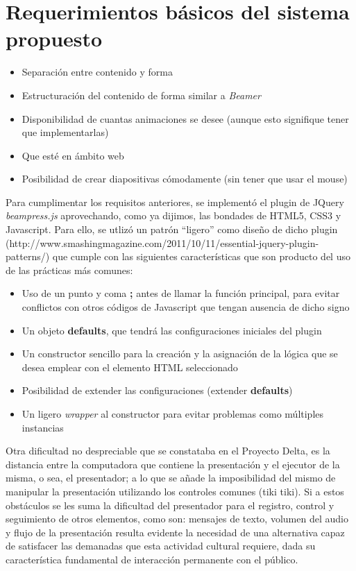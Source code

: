 	\section*{Requerimientos básicos del sistema propuesto} %
	\label{sec:requerimientos_basicos_del_sistema_propuesto}
		\begin{itemize}
				\item Separación entre contenido y forma
				\item Estructuración del contenido de forma similar a \textit{Beamer}
				\item Disponibilidad de cuantas animaciones se desee (aunque esto signifique tener que implementarlas)
				\item Que esté en ámbito web
				\item Posibilidad de crear diapositivas cómodamente (sin tener que usar el mouse)
		\end{itemize}	



	Para cumplimentar los requisitos anteriores, se implementó el plugin de JQuery \textit{beampress.js} aprovechando, como ya dijimos, las bondades de HTML5, CSS3 y Javascript. Para ello, se utlizó un patrón ``ligero'' como diseño de dicho plugin (http://www.smashingmagazine.com/2011/10/11/essential-jquery-plugin-patterns/) que cumple con las siguientes características que son producto del uso de las prácticas más comunes:

	\begin{itemize}
		\item Uso de un punto y coma \textbf{;} antes de llamar la función principal, para evitar conflictos con otros códigos de Javascript que tengan ausencia de dicho signo
		\item Un objeto \textbf{defaults}, que tendrá las configuraciones iniciales del plugin
		\item Un constructor sencillo para la creación y la asignación de la lógica que se desea emplear con el elemento HTML seleccionado
		\item Posibilidad de extender las configuraciones (extender \textbf{defaults})
		\item Un ligero \textit{wrapper} al constructor para evitar problemas como múltiples instancias
	\end{itemize}

	Otra dificultad no despreciable que se constataba en el Proyecto Delta, es la distancia entre la computadora que contiene la presentación y el ejecutor de la misma, o sea, el presentador; a lo que se añade la imposibilidad del mismo de manipular la presentación utilizando los controles comunes (tiki tiki). Si a estos obstáculos se les suma la dificultad del presentador para el registro, control y seguimiento de otros elementos, como son: mensajes de texto, volumen del audio y flujo de la presentación resulta evidente la necesidad de una alternativa capaz de satisfacer las demanadas que esta actividad cultural requiere, dada su característica fundamental de interacción permanente con el público.

